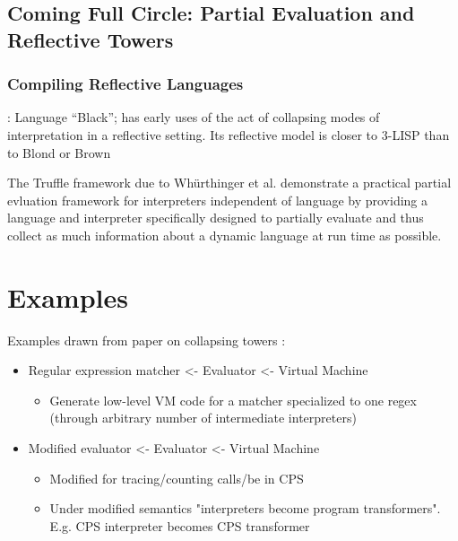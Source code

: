\documentclass{article}
\theoremstyle{definition}
\begin{document}
\subsection{Coming Full Circle: Partial Evaluation and Reflective Towers}
\subsubsection{Compiling Reflective Languages}
\cite{asai1996duplication}: Language ``Black''; has early uses of the act of collapsing modes of interpretation in a reflective setting. Its reflective model is closer to 3-LISP than to Blond or Brown
\cite{asai2015compiling}

The Truffle framework due to Wh{\"u}rthinger et al. \cite{wurthinger2017practical} demonstrate a practical partial evluation framework for interpreters independent of language by providing a language and interpreter specifically designed to partially evaluate and thus collect as much information about a dynamic language at run time as possible.

\section{Examples}
Examples drawn from paper on collapsing towers \cite{amin2017collapsing}:
\begin{itemize}
	\item Regular expression matcher <- Evaluator <- Virtual Machine
	\begin{itemize}
		\item Generate low-level VM code for a matcher specialized to one regex (through arbitrary number of intermediate interpreters)
	\end{itemize}
	\item Modified evaluator <- Evaluator <- Virtual Machine
	\begin{itemize}
		\item Modified for tracing/counting calls/be in CPS
		\item Under modified semantics "interpreters become program transformers". E.g. CPS interpreter becomes CPS transformer
	\end{itemize}
\end{itemize}
\end{document}
